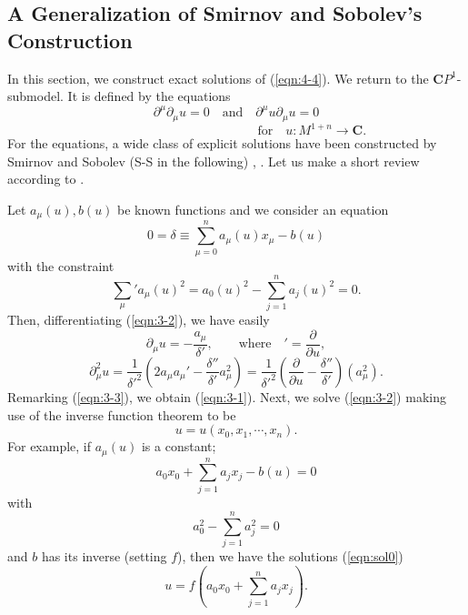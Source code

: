 \documentclass[makeidx,12pt,openany]{report}
\begin{document}
\subsection{A Generalization of Smirnov and Sobolev's Construction}
In this section, we construct exact solutions of (\ref{eqn:4-4}). 
We return to the ${\mathbf{C}}P^1$-submodel. It is defined by the equations
\begin{equation}
 \partial^{\mu}\partial_{\mu}u=0 \quad \mbox{and} \quad 
 \partial^{\mu}u\partial_{\mu}u=0
 \label{eqn:3-1}
\end{equation}
$$ \hspace{5cm} \mbox{for} \quad
 u:M^{1+n} \longrightarrow {\mathbf{C}}.
$$
For the equations, a wide class of explicit solutions have been constructed 
by Smirnov and Sobolev (S-S in the following) \cite{SS1}, \cite{SS2}. 
Let us make a short review according to \cite{BY}. 

Let $a_{\mu}(u), b(u)$ be known functions and we consider an equation
\begin{equation}
 0=\delta \equiv \sum_{\mu =0}^n a_{\mu}(u)x_{\mu}-b(u)
 \label{eqn:3-2}
\end{equation}
with the constraint
\begin{equation}
 \sum_{\mu}{}'a_{\mu}(u)^2 = a_0(u)^2-\sum_{j=1}^n a_j(u)^2=0.
 \label{eqn:3-3}
\end{equation}
Then, differentiating (\ref{eqn:3-2}), we have easily
\begin{equation}
 \partial_{\mu}u=-\frac{a_{\mu}}{\delta'}, \qquad \mbox{where} \quad
  {}'=\frac{\partial}{\partial u},
 \label{eqn:3-4}
\end{equation}
\begin{equation}
 \partial_{\mu}^2 u=\frac{1}{{\delta'}^2}
  (2a_{\mu}a_{\mu}'-\frac{\delta''}{\delta'}a_{\mu}^2)
  =\frac{1}{{\delta'}^2}
  \left( \frac{\partial}{\partial u}-\frac{\delta''}{\delta'} \right) 
  (a_{\mu}^2). 
 \label{eqn:3-5}
\end{equation}
Remarking (\ref{eqn:3-3}), we obtain (\ref{eqn:3-1}). Next, we solve (\ref{eqn:3-2}) making use of the inverse function theorem to be 
\begin{equation}
 u=u(x_0,x_1,\cdots,x_n).
 \label{eqn:3-6}
\end{equation}
For example, if $a_{\mu}(u)$ is a constant;
\begin{equation}
 a_0 x_0+\sum_{j=1}^n a_j x_j-b(u)=0
\end{equation}
with
\begin{equation}
 a_0^2-\sum_{j=1}^n a_j^2=0
\end{equation}
and $b$ has its inverse (setting $f$), then we have the solutions 
(\ref{eqn:sol0})
\begin{equation}
 u=f(a_0 x_0+\sum_{j=1}^n a_j x_j).
\end{equation}
\end{document}
